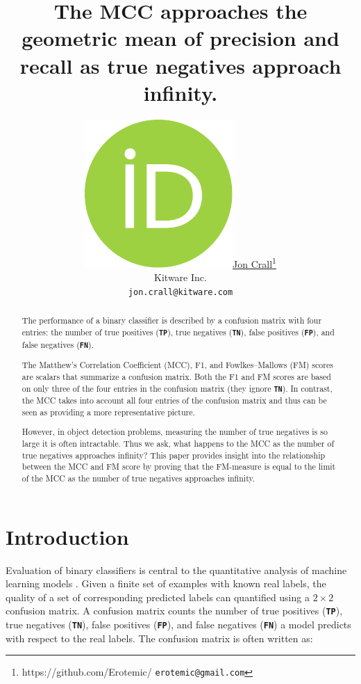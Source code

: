 \documentclass{article}
\title{
    The MCC approaches the geometric mean of precision and recall as true negatives approach infinity.
}
\author{\href{https://orcid.org/0009-0008-8455-7514}{\includegraphics[scale=0.06]{orcid.pdf}\hspace{1mm}Jon Crall}\thanks{https://github.com/Erotemic/ \texttt{erotemic@gmail.com}} \\
	Kitware Inc.\\
	\texttt{jon.crall@kitware.com}
}
\newcommand{\TP}[1]{\textcolor{kwgreen}{\texttt{\textbf{TP}}}}
\newcommand{\FP}[1]{\textcolor{kwred}{\texttt{\textbf{FP}}}}
\newcommand{\TN}[1]{\textcolor{kwblue}{\texttt{\textbf{TN}}}}
\newcommand{\FN}[1]{\textcolor{kworange}{\texttt{\textbf{FN}}}}
\newcommand{\MCC}[0]{\texttt{\textbf{MCC}}}
\newcommand{\Fowlkes}[0]{\texttt{\textbf{FM}}}
\begin{document}
\maketitle

\begin{abstract}

    The performance of a binary classifier is described by a confusion matrix with four entries:
    the number of true positives (\TP{}), true negatives (\TN{}), false positives (\FP{}), and false
      negatives (\FN{}).

    The Matthew's Correlation Coefficient (MCC), F1, and Fowlkes--Mallows (FM) scores are scalars that
      summarize a confusion matrix.
    Both the F1 and FM scores are based on only three of the four entries in the confusion matrix (they
      ignore \TN{}).
    In contrast, the MCC takes into account all four entries of the confusion matrix and thus can be seen as
      providing a more representative picture.

    However, in object detection problems, measuring the number of true negatives is so large it is often
      intractable.
    Thus we ask, what happens to the MCC as the number of true negatives approaches infinity?
    This paper provides insight into the relationship between the MCC and FM score by proving that the
      FM-measure is equal to the limit of the MCC as the number of true negatives approaches infinity.

\end{abstract}




\section{Introduction}

Evaluation of binary classifiers is central to the quantitative analysis of
machine learning models \cite{powers_evaluation_2011}.
Given a finite set of examples with known real labels, the quality of a set of
corresponding predicted labels can quantified using a $2 \times 2$ confusion
matrix.  A confusion matrix counts the number of true positives (\TP{}), true
negatives (\TN{}), false positives (\FP{}), and false negatives (\FN{}) a model
predicts with respect to the real labels. The confusion matrix is often written
as:
\end{document}
